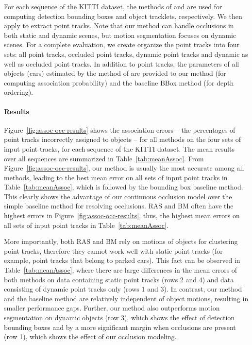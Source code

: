 
For each sequence of the KITTI dataset, the methods of \cite{Felzenszwalb_etal_2010} and \cite{Choi_Savarese_2010} are used for computing detection bounding boxes and object tracklets, respectively. We then apply \cite{Zach2007} to extract point tracks. Note that our method can handle occlusions in both static and dynamic scenes, but motion segmentation focuses on dynamic scenes. For a complete evaluation, we create organize the point tracks into four sets: all point tracks, occluded point tracks, dynamic point tracks and dynamic as well as occluded point tracks. In addition to point tracks, the parameters of all objects (cars) estimated by the method of \cite{Song_Chandraker_2014} are provided to our method (for computing association probability) and the baseline BBox method (for depth ordering).


\vspace{-0.4cm}
\paragraph{Results}
Figure~\ref{fig:assoc-occ-results} shows the association errors -- the percentages of point tracks incorrectly assigned to objects -- for all methods on the four sets of input point tracks, for each sequence of the KITTI dataset. The mean results over all sequences are summarized in Table~\ref{tab:meanAssoc}. From Figure~\ref{fig:assoc-occ-results}, our method is usually the most accurate among all methods, leading to the best mean error on all sets of input point tracks in Table~\ref{tab:meanAssoc}, which is followed by the bounding box baseline method. This clearly shows the advantage of our continuous occlusion model over the simple baseline method for resolving occlusions. RAS and BM often have the highest errors in Figure~\ref{fig:assoc-occ-results}, thus, the highest mean errors on all sets of input point tracks in Table~\ref{tab:meanAssoc}. 

More importantly, both RAS and BM rely on motions of objects for clustering point tracks, therefore they cannot work well with static point tracks (for example, point tracks that belong to parked cars). This fact can be observed in Table~\ref{tab:meanAssoc}, where there are large differences in the mean errors of both methods on data containing static point tracks (rows 2 and 4) and data consisting of dynamic point tracks only (rows 1 and 3). In contrast, our method and the baseline method are relatively independent of object motions, resulting in smaller performance gaps. Further, our method also outperforms motion segmentation on dynamic objects (row 3), which shows the effect of detection bounding boxes and by a more significant margin when occlusions are present (row 1), which shows the effect of our occlusion modeling.

